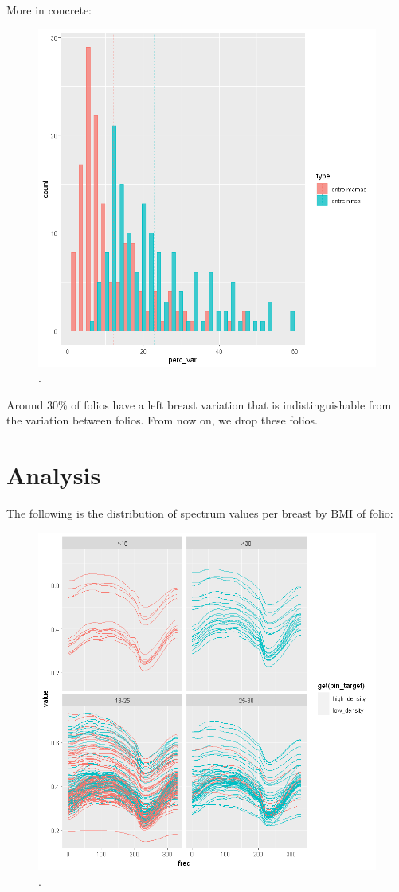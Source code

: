 \documentclass[a4paper,12pt]{article}
\begin{document}
More in concrete:


\begin{figure}[ht!]
	\centering
	\includegraphics[trim={0 0cm 0cm 0}, clip, scale=0.55]{figures/variability_histogram.png}
	\caption{.} 
	\label{fig:abt_vs_base}
\end{figure}

Around 30\% of folios have a left breast variation that is indistinguishable from the variation between folios.  From now on, we drop these folios.

\section*{Analysis}
The following is the distribution of spectrum values per breast by BMI of folio:
\begin{figure}[ht!]
	\centering
	\includegraphics[trim={0 0cm 0cm 0}, clip, scale=0.55]{figures/scio_by_bmi.png}
	\caption{.} 
	\label{fig:abt_vs_base}
\end{figure}
\end{document}
